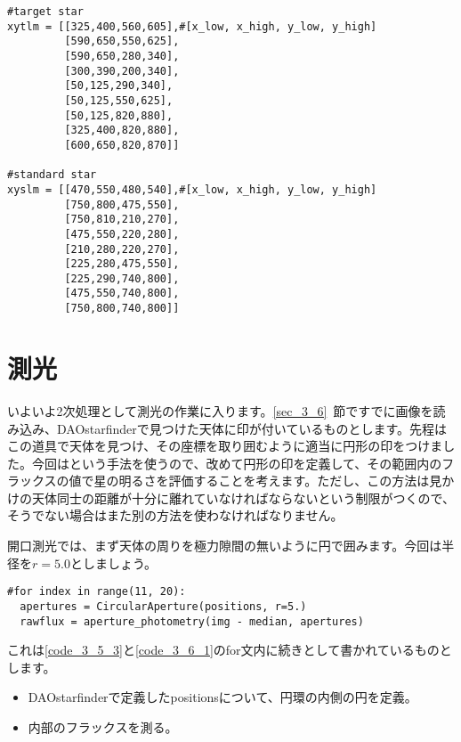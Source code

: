 \begin{lstlisting}[caption=天体の存在範囲の指定,label=code_3_6_2]
#target star
xytlm = [[325,400,560,605],#[x_low, x_high, y_low, y_high]
         [590,650,550,625],
         [590,650,280,340],
         [300,390,200,340],
         [50,125,290,340],
         [50,125,550,625],
         [50,125,820,880],
         [325,400,820,880],
         [600,650,820,870]]

#standard star
xyslm = [[470,550,480,540],#[x_low, x_high, y_low, y_high]
         [750,800,475,550],
         [750,810,210,270],
         [475,550,220,280],
         [210,280,220,270],
         [225,280,475,550],
         [225,290,740,800],
         [475,550,740,800],
         [750,800,740,800]]
\end{lstlisting}

\section{測光}
\label{sec_3_7}
いよいよ2次処理として測光の作業に入ります。\ref{sec_3_6}~節ですでに画像を読み込み、DAOstarfinderで見つけた天体に印が付いているものとします。先程はこの道具で天体を見つけ、その座標を取り囲むように適当に円形の印をつけました。今回はという手法を使うので、改めて円形の印を定義して、その範囲内のフラックスの値で星の明るさを評価することを考えます。ただし、この方法は見かけの天体同士の距離が十分に離れていなければならないという制限がつくので、そうでない場合はまた別の方法を使わなければなりません。

開口測光では、まず天体の周りを極力隙間の無いように円で囲みます。今回は半径を$r=5.0$としましょう。
\begin{lstlisting}[caption=開口測光の準備,label=code_3_7_1]
#for index in range(11, 20):
  apertures = CircularAperture(positions, r=5.)
  rawflux = aperture_photometry(img - median, apertures)
\end{lstlisting}
これは\ref{code_3_5_3}と\ref{code_3_6_1}のfor文内に続きとして書かれているものとします。
\begin{itemize}
  \item DAOstarfinderで定義したpositionsについて、円環の内側の円を定義。
  \item 内部のフラックスを測る。
\end{itemize}

